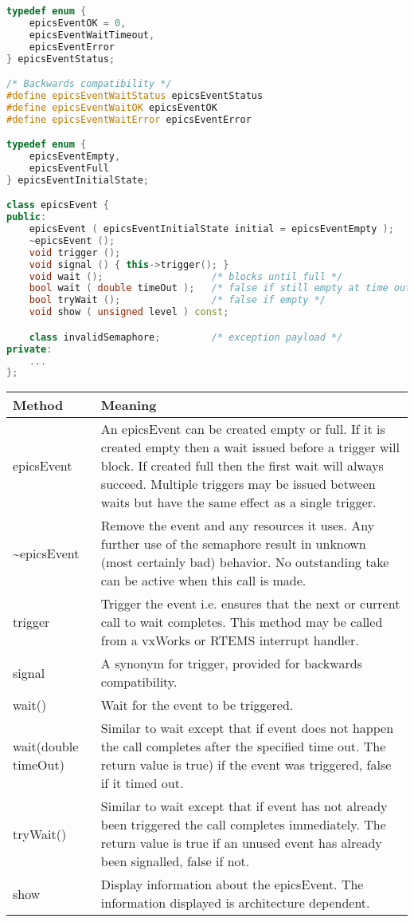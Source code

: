 \begin{lstlisting}[language=C++]
typedef enum {
    epicsEventOK = 0,
    epicsEventWaitTimeout,
    epicsEventError
} epicsEventStatus;

/* Backwards compatibility */
#define epicsEventWaitStatus epicsEventStatus
#define epicsEventWaitOK epicsEventOK
#define epicsEventWaitError epicsEventError

typedef enum {
    epicsEventEmpty,
    epicsEventFull
} epicsEventInitialState;

class epicsEvent {
public:
    epicsEvent ( epicsEventInitialState initial = epicsEventEmpty );
    ~epicsEvent ();
    void trigger ();
    void signal () { this->trigger(); }
    void wait ();                   /* blocks until full */
    bool wait ( double timeOut );   /* false if still empty at time out */
    bool tryWait ();                /* false if empty */
    void show ( unsigned level ) const;

    class invalidSemaphore;         /* exception payload */
private:
    ...
};
\end{lstlisting}

\begin{center}
\begin{longtable}{p{1.25in}p{5.0in}}
\textbf{Method} & \textbf{Meaning}\\
\hline
epicsEvent & An epicsEvent can be created empty or full.
If it is created empty then a wait issued before a trigger will block.
If created full then the first wait will always succeed.
Multiple triggers may be issued between waits but have the same effect as a single trigger.\\
\~{}epicsEvent & Remove the event and any resources it uses.
Any further use of the semaphore result in unknown (most certainly bad) behavior.
No outstanding take can be active when this call is made.\\
trigger & Trigger the event i.e. ensures that the next or current call to wait completes.
This method may be called from a vxWorks or RTEMS interrupt handler.\\
signal & A synonym for trigger, provided for backwards compatibility.\\
wait() & Wait for the event to be triggered.\\
wait(double timeOut) & Similar to wait except that if event does not happen the call completes after the specified time out.
The return value is true) if the event was triggered, false if it timed out.\\
tryWait() & Similar to wait except that if event has not already been triggered the call completes immediately.
The return value is true if an unused event has already been signalled, false if not.\\
show & Display information about the epicsEvent.
The information displayed is architecture dependent.
\end{longtable}
\end{center}


